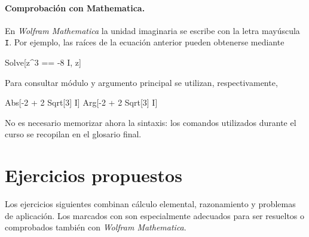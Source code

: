 \paragraph{Comprobación con Mathematica.}
En \textit{Wolfram Mathematica} la unidad imaginaria se escribe con la letra mayúscula \texttt{I}. Por ejemplo, las raíces de la ecuación anterior pueden obtenerse mediante
\begin{mathematicacode}
Solve[z^3 == -8 I, z]
\end{mathematicacode}
Para consultar módulo y argumento principal se utilizan, respectivamente,
\begin{mathematicacode}
Abs[-2 + 2 Sqrt[3] I]
Arg[-2 + 2 Sqrt[3] I]
\end{mathematicacode}
No es necesario memorizar ahora la sintaxis: los comandos utilizados durante el curso se recopilan en el glosario final.

\section*{Ejercicios propuestos}
\label{sec:ejercicios-t1}

Los ejercicios siguientes combinan cálculo elemental, razonamiento y problemas de aplicación. Los marcados con \M son especialmente adecuados para ser resueltos o comprobados también con \textit{Wolfram Mathematica}.

